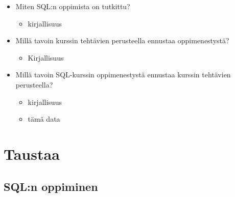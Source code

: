 \documentclass[finnish,twoside,openright]{HYgraduMLDS}
\begin{document}
\begin{itemize}
    \item Miten SQL:n oppimista on tutkittu?
    \begin{itemize}
        \item kirjallisuus
    \end{itemize}
    \item Millä tavoin kurssin tehtävien perusteella ennustaa oppimenestystä?
    \begin{itemize}
        \item Kirjallisuus
    \end{itemize}
    \item Millä tavoin SQL-kurssin oppimenestystä ennustaa kurssin tehtävien perusteella?
    \begin{itemize}
        \item kirjallisuus
        \item tämä data
    \end{itemize}
\end{itemize}


\chapter{Taustaa}

\section{SQL:n oppiminen}
\end{document}
